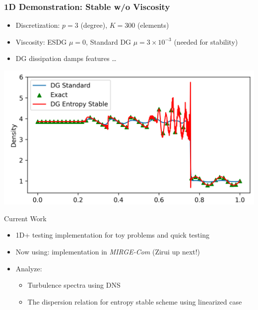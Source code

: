 \begin{frame}\frametitle{1D Demonstration:  Stable w/o Viscosity}
	\begin{itemize}
	
		\item Discretization: $p=3$ (degree), $K = 300$ (elements)
		\item Viscosity: ESDG $\mu = 0$, Standard DG $\mu = 3\times 10^{-3}$ (needed for stability)
                \item DG dissipation damps features \ldots
                \end{itemize}
                \medskip
                \begin{center}
                          \includegraphics[width=0.6\linewidth]{figures/RHO.png}          
	\end{center}
        \centerline{}
\end{frame}

\begin{frame}{Current Work}
	\begin{itemize}
		\setlength{\itemsep}{0.2in}
		\item  1D+ testing implementation for toy problems and quick testing
		\item  Now using: implementation in \textit{MIRGE-Com} (Zirui up next!)
		\item Analyze:
		\begin{itemize}
			\item Turbulence spectra using DNS
			\item The dispersion relation for entropy stable scheme using linearized case
		\end{itemize}
	\end{itemize}
      \end{frame}


